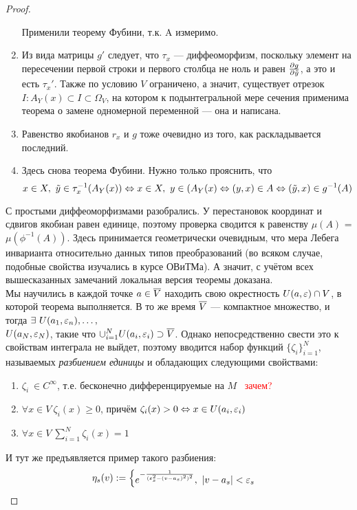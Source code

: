 \begin{proof}
\begin{enumerate}
		Применили теорему Фубини, т.к. A измеримо.
		\item
		Из вида матрицы $g'$ следует, что $\tau_x$ --- диффеоморфизм, поскольку элемент на пересечении первой строки и первого столбца не ноль и равен $\frac{\partial g}{\partial \tilde y}$, а это и есть $\tau_x'$. Также по условию $V$ ограничено, а значит, существует отрезок $I \colon A_Y(x) \subset I \subset \Omega_V$, на котором к подынтегральной мере сечения применима теорема о замене одномерной переменной --- она и написана.
		\item
		Равенство якобианов $r_x$ и $g$ тоже очевидно из того, как раскладывается последний.
		\item 
		Здесь снова теорема Фубини. Нужно только прояснить, что
		\[
			x \in X, \ \tilde y \in \tau_x^{-1}(A_Y(x)) \Leftrightarrow x \in X, \ y \in (A_Y(x) \Leftrightarrow (y, x) \in A \Leftrightarrow (\tilde y, x) \in g^{-1}(A)
		\]
	\end{enumerate}
	С простыми диффеоморфизмами разобрались. У перестановок координат и сдвигов якобиан равен единице, поэтому проверка сводится к равенству $\mu(A)$ = $\mu(\phi^{-1}(A))$. Здесь принимается геометрически очевидным, что мера Лебега инварианта относительно данных типов преобразований (во всяком случае, подобные свойства изучались в курсе ОВиТМа). А значит, с учётом всех вышесказанных замечаний локальная версия теоремы доказана. \\
	Мы научились в каждой точке $a \in \overline{V}$ находить свою окрестность $U(a, \varepsilon) \cap V$, в которой теорема выполняется. В то же время $\overline{V}$ --- компактное множество, и тогда $\exists \ U(a_1, \eps_n), \hdots,$\\$ U(a_N, \varepsilon_N)$, такие что $\cup_{i=1}^N U(a_i, \varepsilon_i) \supset \overline{V}$. Однако непосредственно свести это к свойствам интеграла не выйдет, поэтому вводится набор функций $\{\zeta_i\}_{i=1}^N$, называемых \textit{разбиением единицы} и обладающих следующими свойствами:
	\begin{enumerate}
		\item
		$\zeta_i\ \in C^\infty$, т.е. бесконечно дифференцируемые на $M$ \ \textcolor{red}{зачем?}
		\item
		$\forall x \in V \ \zeta_i(x) \geq 0$, причём $\zeta_i(x) > 0 \Leftrightarrow x \in U(a_i, \varepsilon_i)$
		\item
		$\forall x \in V \ \sum_{i=1}^N \zeta_i(x) = 1$
	\end{enumerate} 
	И тут же предъявляется пример такого разбиения:
	\begin{align*}
		&{\eta_s(v):= \left\{\begin{aligned}
			&{e^{-\frac{1}{(\varepsilon_s^2 - (v - a_s)^2)^2}}}, \ \left|v - a_s\right| < \varepsilon_s \\
\end{aligned}\right.}
\end{align*}
\end{proof}
